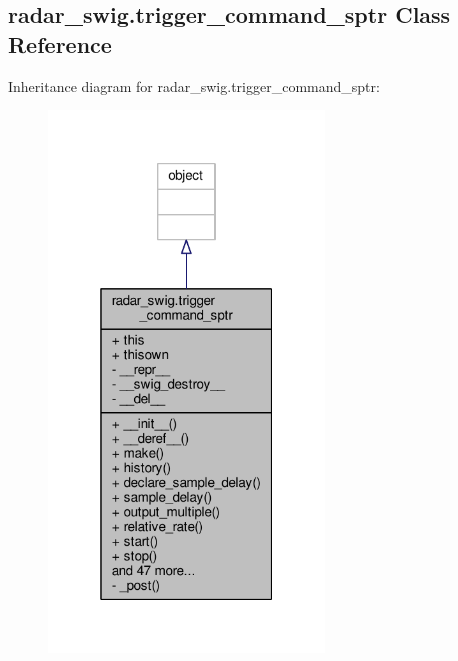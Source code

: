 \subsection{radar\+\_\+swig.\+trigger\+\_\+command\+\_\+sptr Class Reference}
\label{classradar__swig_1_1trigger__command__sptr}


Inheritance diagram for radar\+\_\+swig.\+trigger\+\_\+command\+\_\+sptr\+:
\nopagebreak
\begin{figure}[H]
\begin{center}
\leavevmode
\includegraphics[width=208pt]{de/d47/classradar__swig_1_1trigger__command__sptr__inherit__graph}
\end{center}
\end{figure}


